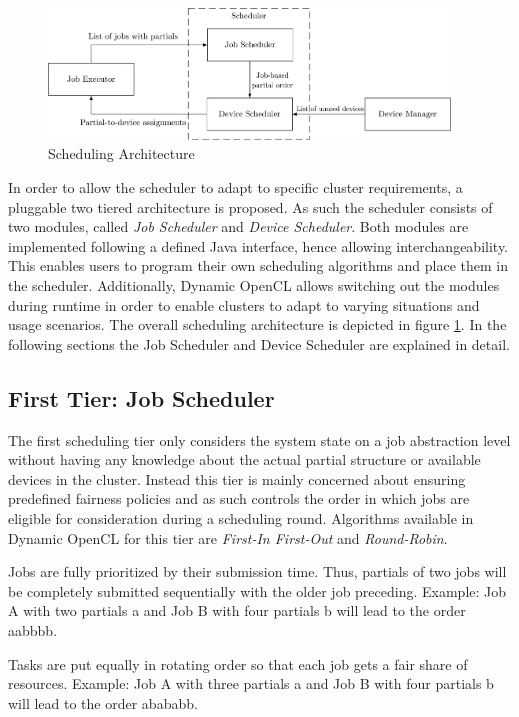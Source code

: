 \begin{figure}[!htb]
	\includegraphics[width=0.95\textwidth]{drawings/scheduling_arch.pdf}
	\centering
	\caption{Scheduling Architecture}
	\label{img:scheduling_arch}
\end{figure}

In order to allow the scheduler to adapt to specific cluster requirements, a pluggable two tiered architecture is proposed. As such the scheduler consists of two modules, called \textit{Job Scheduler} and \textit{Device Scheduler}. Both modules are implemented following a defined Java interface, hence allowing interchangeability. This enables users to program their own scheduling algorithms and place them in the scheduler. Additionally, Dynamic OpenCL allows switching out the modules during runtime in order to enable clusters to adapt to varying situations and usage scenarios. The overall scheduling architecture is depicted in figure \ref{img:scheduling_arch}. In the following sections the Job Scheduler and Device Scheduler are explained in detail.

\subsection{First Tier: Job Scheduler}
The first scheduling tier only considers the system state on a job abstraction level without having any knowledge about the actual partial structure or available devices in the cluster. Instead this tier is mainly concerned about ensuring predefined fairness policies and as such controls the order in which jobs are eligible for consideration during a scheduling round. Algorithms available in Dynamic OpenCL for this tier are \textit{First-In First-Out} and \textit{Round-Robin}.

\begin{description}[style=nextline]
	\item[First-In First-Out (abbr. FIFO)]
	Jobs are fully prioritized by their submission time. Thus, partials of two jobs will be completely submitted sequentially with the older job preceding. Example: Job A with two partials a and Job B with four partials b will lead to the order aabbbb.
	\item[Round-Robin]
	Tasks are put equally in rotating order so that each job gets a fair share of resources. Example: Job A with three partials a and Job B with four partials b will lead to the order abababb.
\end{description}

